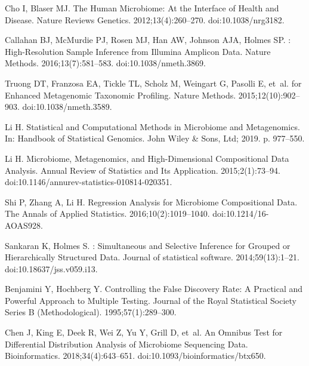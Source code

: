 \documentclass[10pt,letterpaper]{article}
\begin{document}
\begin{thebibliography}{10}

    Cho I, Blaser MJ.
    \newblock The Human Microbiome: At the Interface of Health and Disease.
    \newblock Nature Reviews Genetics. 2012;13(4):260--270.
    \newblock doi:{10.1038/nrg3182}.
    
    Callahan BJ, McMurdie PJ, Rosen MJ, Han AW, Johnson AJA, Holmes SP.
    : {{High}}-Resolution Sample Inference from {{Illumina}}
      Amplicon Data.
    \newblock Nature Methods. 2016;13(7):581--583.
    \newblock doi:{10.1038/nmeth.3869}.
    
    Truong DT, Franzosa EA, Tickle TL, Scholz M, Weingart G, Pasolli E, et~al.
     for Enhanced Metagenomic Taxonomic Profiling.
    \newblock Nature Methods. 2015;12(10):902--903.
    \newblock doi:{10.1038/nmeth.3589}.
    
    Li H.
    \newblock Statistical and {{Computational Methods}} in {{Microbiome}} and
      {{Metagenomics}}.
    \newblock In: Handbook of {{Statistical Genomics}}. {John Wiley \& Sons, Ltd};
      2019. p. 977--550.
    
    Li H.
    \newblock Microbiome, {{Metagenomics}}, and {{High}}-{{Dimensional
      Compositional Data Analysis}}.
    \newblock Annual Review of Statistics and Its Application. 2015;2(1):73--94.
    \newblock doi:{10.1146/annurev-statistics-010814-020351}.
    
    Shi P, Zhang A, Li H.
    \newblock Regression Analysis for Microbiome Compositional Data.
    \newblock The Annals of Applied Statistics. 2016;10(2):1019--1040.
    \newblock doi:{10.1214/16-AOAS928}.
    
    Sankaran K, Holmes S.
    : {{Simultaneous}} and {{Selective Inference}} for
      {{Grouped}} or {{Hierarchically Structured Data}}.
    \newblock Journal of statistical software. 2014;59(13):1--21.
    \newblock doi:{10.18637/jss.v059.i13}.
    
    Benjamini Y, Hochberg Y.
    \newblock Controlling the {{False Discovery Rate}}: {{A Practical}} and
      {{Powerful Approach}} to {{Multiple Testing}}.
    \newblock Journal of the Royal Statistical Society Series B (Methodological).
      1995;57(1):289--300.
    
    Chen J, King E, Deek R, Wei Z, Yu Y, Grill D, et~al.
    \newblock An Omnibus Test for Differential Distribution Analysis of Microbiome
      Sequencing Data.
    \newblock Bioinformatics. 2018;34(4):643--651.
    \newblock doi:{10.1093/bioinformatics/btx650}.
    

\end{thebibliography}
\end{document}
